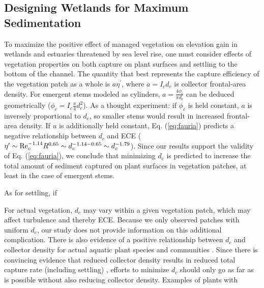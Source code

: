 \documentclass[geosciences,article,submit,moreauthors,pdftex]{Definitions/mdpi}
\begin{document}
\subsection{Designing Wetlands for Maximum Sedimentation}

To maximize the positive effect of managed vegetation on elevation gain in wetlands and estuaries threatened by sea level rise, one must consider effects of vegetation properties on both capture on plant surfaces and settling to the bottom of the channel. The quantity that best represents the capture efficiency of the vegetation patch as a whole is $a \eta^\prime$, where $a = I_cd_c$ is collector frontal-area density. For emergent stems modeled as cylinders, $a = \frac{4\phi_c}{\pi d_c}$ can be deduced geometrically ($\phi_c = I_c\frac{\pi}{4}d_c^2$). As a thought experiment: if $\phi_c$ is held constant, $a$ is inversely proportional to $d_c$, so smaller stems would result in increased frontal-area density. If $u$ is additionally held constant, Eq. (\ref{eq:fauria}) predicts a negative relationship between $d_c$ and ECE ($\eta^\prime \sim \mathrm{Re}_c^{-1.14}R^{0.65} \sim d_c^{-1.14 - 0.65} \sim d_c^{-1.79}$). Since our results support the validity of Eq. (\ref{eq:fauria}), we conclude that minimizing $d_c$ is predicted to increase the total amount of sediment captured on plant surfaces in vegetation patches, at least in the case of emergent stems.

As for settling, if 

For actual vegetation, $d_c$ may vary within a given vegetation patch, which may affect turbulence and thereby ECE. Because we only observed patches with uniform $d_c$, our study does not provide information on this additional complication. There is also evidence of a positive relationship between $d_c$ and collector density for actual aquatic plant species and communities \cite{mudd2010does}. Since there is convincing evidence that reduced collector density results in reduced total capture rate (including settling) \cite{Fauria_2015}, efforts to minimize $d_c$ should only go as far as is possible without also reducing collector density. Examples of plants with

\vspace{6pt} 


\end{document}
